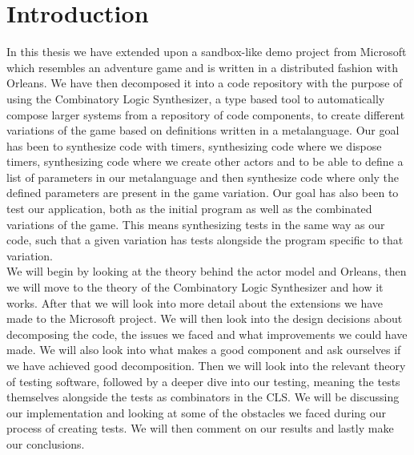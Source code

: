 \section{Introduction}
In this thesis we have extended upon a sandbox-like demo project from Microsoft \cite{AdventureGame} which resembles an adventure game and is written in a distributed fashion with Orleans. We have then decomposed it into a code repository with the  purpose of using the Combinatory Logic Synthesizer, a type based tool to automatically compose larger systems from a repository of code components, to create different variations of the game based on definitions written in a metalanguage. Our goal has been to synthesize code with timers, synthesizing code where we dispose timers, synthesizing code where we create other actors and to be able to define a list of parameters in our metalanguage and then synthesize code where only the defined parameters are present in the game variation. Our goal has also been to test our application, both as the initial program as well as the combinated variations of the game. This means synthesizing tests in the same way as our code, such that a given variation has tests alongside the program specific to that variation. \\
We will begin by looking at the theory behind the actor model and Orleans, then we will move to the theory of the Combinatory Logic Synthesizer and how it works. After that we will look into more detail about the extensions we have made to the Microsoft project. We will then look into the design decisions about decomposing the code, the issues we faced and what improvements we could have made. We will also look into what makes a good component and ask ourselves if we have achieved good decomposition. 
Then we will look into the relevant theory of testing software, followed by a deeper dive into our testing, meaning the tests themselves alongside the tests as combinators in the CLS. We will be discussing our implementation and looking at some of the obstacles we faced during our process of creating tests. We will then comment on our results and lastly make our conclusions.